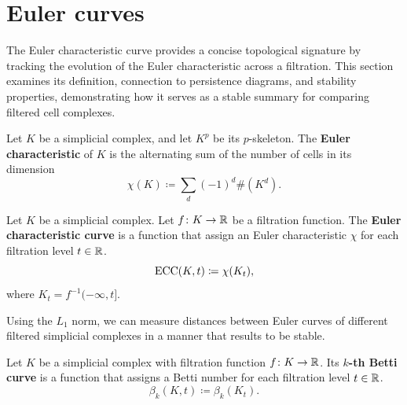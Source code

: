 \section{Euler curves}  \label{sec:euler-curves}

The Euler characteristic curve provides a concise topological signature by tracking the evolution of the Euler characteristic across a filtration. This section examines its definition, connection to persistence diagrams, and stability properties, demonstrating how it serves as a stable summary for comparing filtered cell complexes.

\begin{definition}
    Let $ K $ be a simplicial complex, and let $ K^p $ be its $p$-skeleton. The {\bf Euler characteristic} of $ K $ is the alternating sum of the number of cells in its dimension
    \begin{equation}
        \chi(K) \coloneq \sum_d (-1)^d \#(K^d).
    \end{equation}
\end{definition}

\begin{definition}
    Let $ K $ be a simplicial complex. Let $ f \colon K \to \mathbb R $ be a filtration function. The {\bf Euler characteristic curve} is a function that assign an Euler characteristic $ \chi $ for each filtration level $ t \in \mathbb R $. 
    \begin{equation}
        \operatorname{ECC}(K, t) \coloneq \chi(K_t),
    \end{equation}
    where $ K_t = f^{-1} (-\infty, t] $.
\end{definition}

Using the $L_1$ norm, we can measure distances between Euler curves of different filtered simplicial complexes in a manner that results to be stable.

\begin{definition}
    Let $ K $ be a simplicial complex with filtration function $ f \colon K \to \mathbb R $. Its {\bf $k$-th Betti curve} is a function that assigns a Betti number for each filtration level $t \in \mathbb R $.
    \begin{equation}
        \beta_k(K, t) \coloneq \beta_k(K_t).
    \end{equation}
\end{definition}

